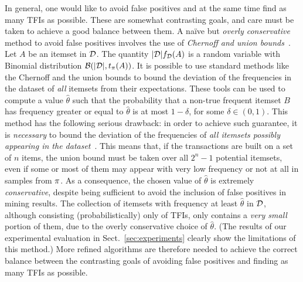 In general, one would like to avoid false positives and 
at the same time find as many TFIs as possible. These are somewhat contrasting
goals, and care must be taken to achieve a good balance between them.
A na\"ive but \emph{overly conservative} method to avoid false positives
involves the use of \emph{Chernoff and union bounds}~\citep{MitzenmacherU05}.
Let $A$ be an itemset in ${\cal D}$. The quantity $|{\cal D}|f_{\cal D}(A)$ is a random variable with
Binomial distribution $\mathcal{B}(|{\cal D}|,t_\pi(A))$. It is possible to use
standard methods like the Chernoff and the union bounds to bound the deviation
of the frequencies in the dataset of \emph{all} itemsets from their
expectations. These tools can be used to compute a value $\hat\theta$ such that
the probability that a non-true frequent itemset $B$ has frequency
greater or equal to $\hat\theta$ is at most $1-\delta$, for some
$\delta\in(0,1)$. This method has the following serious drawback: in order to
achieve such guarantee, it is \emph{necessary} to bound the deviation of the
frequencies of \emph{all itemsets possibly appearing in the dataset}~\citep{KirschMAPUV12}. This means
that, if the transactions are built on a set of $n$ items, the union bound must
be taken over all $2^n-1$ potential itemsets, even if some or most of them may
appear with very low frequency or not at all in samples from $\pi$. As a
consequence, the chosen value of $\hat\theta$ is extremely \emph{conservative}, despite
being sufficient to avoid the inclusion of false positives in mining results.  %
The collection of itemsets with frequency at least $\hat\theta$ in ${\cal D}$,
although consisting (probabilistically) only of TFIs, only contains a
\emph{very small} portion of them, due to the overly conservative choice of
$\hat\theta$. (The results of our experimental evaluation
in Sect.~\ref{sec:experiments} clearly show the limitations of this method.) More
refined algorithms are therefore needed to achieve the correct balance between
the contrasting goals of avoiding false positives and finding as many TFIs as
possible.

